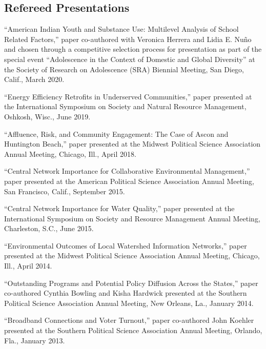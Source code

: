 \documentclass[11pt,letterpaper]{article}
\renewenvironment{itemize}{
  \begin{list}{}{
    \setlength{\leftmargin}{1.5em}
    \setlength{\itemsep}{0.25em}
    \setlength{\parskip}{0pt}
    \setlength{\parsep}{0.25em}
  }
}{
  \end{list}
}
\begin{document}
\subsection*{Refereed Presentations}
	\begin{itemize}\leftmargin=2pt\itemindent=-15pt
		
		\item ``American Indian Youth and Substance Use: Multilevel Analysis of School Related Factors,'' paper co-authored with Veronica Herrera and Lidia E. Nu\~no and chosen through a competitive selection process for presentation as part of the special event ``Adolescence in the Context of Domestic and Global Diversity'' at the Society of Research on Adolescence (SRA) Biennial Meeting, San Diego, Calif., March 2020. 
		
		\item ``Energy Efficiency Retrofits in Underserved Communities,'' paper presented at the International Symposium on Society and Natural Resource Management, Oshkosh, Wisc., June 2019.
		
		\item ``Affluence, Risk, and Community Engagement: The Case of Ascon and Huntington Beach,'' paper presented at the Midwest Political Science Association Annual Meeting, Chicago, Ill., April 2018.
		
		\item ``Central Network Importance for Collaborative Environmental Management,'' paper presented at the American Political Science Association Annual Meeting, San Francisco, Calif., September 2015.
		
		\item ``Central Network Importance for Water Quality,'' paper presented at the International Symposium on Society and Resource Management Annual Meeting, Charleston, S.C., June 2015.
		
		\item ``Environmental Outcomes of Local Watershed Information Networks,'' paper presented at the Midwest Political Science Association Annual Meeting, Chicago, Ill., April 2014.
		
		\item ``Outstanding Programs and Potential Policy Diffusion Across the States,'' paper co-authored Cynthia Bowling and Kisha Hardwick presented at the Southern Political Science Association Annual Meeting, New Orleans, La., January 2014. 
		
		\item ``Broadband Connections and Voter Turnout,'' paper co-authored John Koehler presented at the Southern Political Science Association Annual Meeting, Orlando, Fla., January 2013.
		

\end{itemize}
\end{document}
